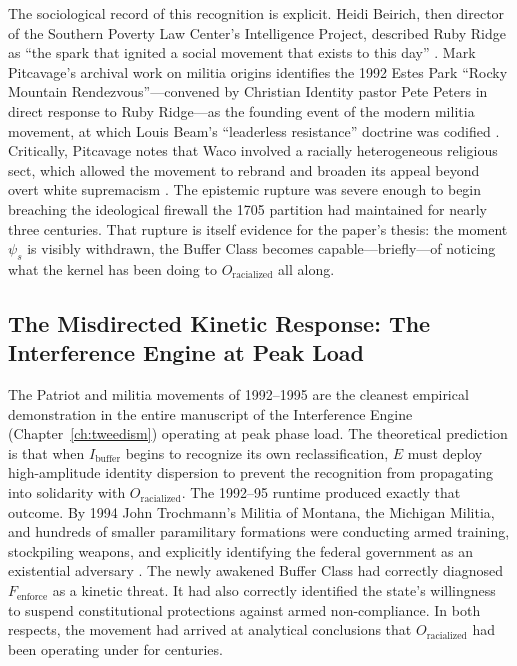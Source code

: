 The sociological record of this recognition is explicit. Heidi Beirich, then director of the Southern Poverty Law Center's Intelligence Project, described Ruby Ridge as ``the spark that ignited a social movement that exists to this day'' \cite{splc_patriot_timeline}. Mark Pitcavage's archival work on militia origins identifies the 1992 Estes Park ``Rocky Mountain Rendezvous''---convened by Christian Identity pastor Pete Peters in direct response to Ruby Ridge---as the founding event of the modern militia movement, at which Louis Beam's ``leaderless resistance'' doctrine was codified \cite{pitcavage2001, splc_patriot_timeline}. Critically, Pitcavage notes that Waco involved a racially heterogeneous religious sect, which allowed the movement to rebrand and broaden its appeal beyond overt white supremacism \cite{pitcavage2001}. The epistemic rupture was severe enough to begin breaching the ideological firewall the 1705 partition had maintained for nearly three centuries. That rupture is itself evidence for the paper's thesis: the moment $\psi_s$ is visibly withdrawn, the Buffer Class becomes capable---briefly---of noticing what the kernel has been doing to $O_{\text{racialized}}$ all along.

\subsection{The Misdirected Kinetic Response: The Interference Engine at Peak Load}
\label{subsec:misdirected_kinetic}

The Patriot and militia movements of 1992--1995 are the cleanest empirical demonstration in the entire manuscript of the Interference Engine (Chapter~\ref{ch:tweedism}) operating at peak phase load. The theoretical prediction is that when $I_{\text{buffer}}$ begins to recognize its own reclassification, $E$ must deploy high-amplitude identity dispersion to prevent the recognition from propagating into solidarity with $O_{\text{racialized}}$. The 1992--95 runtime produced exactly that outcome. By 1994 John Trochmann's Militia of Montana, the Michigan Militia, and hundreds of smaller paramilitary formations were conducting armed training, stockpiling weapons, and explicitly identifying the federal government as an existential adversary \cite{splc_patriot_timeline, markham_willamette}. The newly awakened Buffer Class had correctly diagnosed $F_{\text{enforce}}$ as a kinetic threat. It had also correctly identified the state's willingness to suspend constitutional protections against armed non-compliance. In both respects, the movement had arrived at analytical conclusions that $O_{\text{racialized}}$ had been operating under for centuries.

